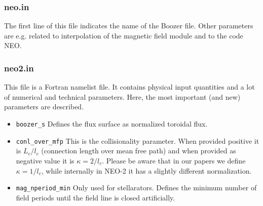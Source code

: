 \documentclass{article}
\begin{document}
\subsubsection{neo.in}
The first line of this file indicates the name of the Boozer file. Other parameters are e.g. related to interpolation of the magnetic field module and to the code NEO. 

\subsubsection{neo2.in}
This file is a Fortran namelist file. It contains physical input quantities and a lot of numerical and technical parameters. Here, the most important (and new) parameters are described. 

\begin{itemize}
 \item \verb|boozer_s| \newline
 Defines the flux surface as normalized toroidal flux. 
 \item \verb|conl_over_mfp|\newline
 This is the collisionality parameter. When provided positive it is $L_c/l_c$ (connection length over mean free path) and when provided as negative value it is $\kappa = 2/l_c$. Please be aware that in our papers we define $\kappa = 1/l_c$, while internally in NEO-2 it has a slightly different normalization. 
 \item \verb|mag_nperiod_min|\newline
 Only used for stellarators. Defines the minimum number of field periods until the field line is closed artificially. 
\end{itemize}
\end{document}

